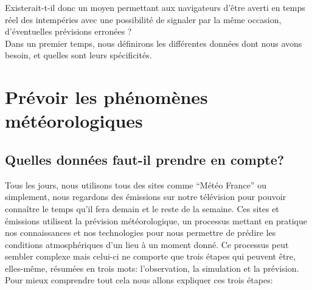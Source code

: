 \documentclass[12pt]{report}
\begin{document}
    Existerait-t-il donc un moyen permettant aux navigateurs d’être averti en temps réel des intempéries avec une possibilité de signaler par la même occasion, d’éventuelles prévisions erronées ?\\

    Dans un premier temps, nous définirons les différentes données dont nous avons besoin, et quelles sont leurs spécificités.

    \clearpage

\section{Prévoir les phénomènes météorologiques}

    \subsection{Quelles données faut-il prendre en compte?}
    
        Tous les jours, nous utilisons tous des sites comme “Météo France” ou simplement, nous regardons des émissions sur notre télévision pour pouvoir connaître le temps qu’il fera demain et le reste de la semaine. 
        Ces sites et émissions utilisent la prévision météorologique, un processus mettant en pratique nos connaissances et nos technologies pour nous permettre de prédire les conditions atmosphériques d’un lieu à un moment donné.
        Ce processus peut sembler complexe mais celui-ci ne comporte que trois étapes \cite{étapes des prévisions} qui peuvent être, elles-même, résumées en trois mots: l’observation, la simulation et la prévision.\\
        Pour mieux comprendre tout cela nous allons expliquer ces trois étapes:
        
\end{document}
